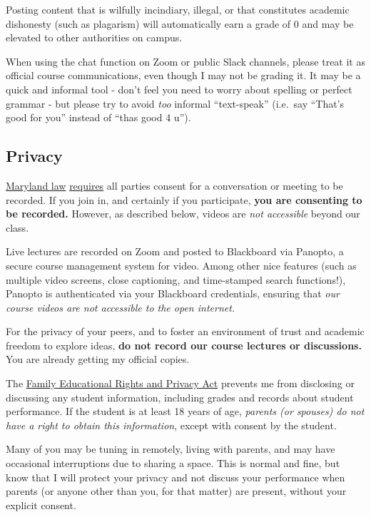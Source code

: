 \documentclass{article}
\begin{document}
Posting content that is wilfully incindiary, illegal, or that
constitutes academic dishonesty (such as plagarism) will automatically
earn a grade of 0 and may be elevated to other authorities on campus.

When using the chat function on Zoom or public Slack channels, please
treat it as official course communications, even though I may not be
grading it. It may be a quick and informal tool - don't feel you need to
worry about spelling or perfect grammar - but please try to avoid
\emph{too} informal ``text-speak'' (i.e.~say ``That's good for you''
instead of ``thas good 4 u'').

\hypertarget{privacy}{%
\subsection*{Privacy}\label{privacy}}

\href{https://www.execvision.io/blog/maryland-call-recording-laws/}{Maryland
law}
\href{https://law.justia.com/codes/maryland/2005/gcj/10-402.html}{requires}
all parties consent for a conversation or meeting to be recorded. If you
join in, and certainly if you participate, \textbf{you are consenting to
be recorded.} However, as described below, videos are \emph{not
accessible} beyond our class.

Live lectures are recorded on Zoom and posted to Blackboard via Panopto,
a secure course management system for video. Among other nice features
(such as multiple video screens, close captioning, and time-stamped
search functions!), Panopto is authenticated via your Blackboard
credentials, ensuring that \emph{our course videos are not accessible to
the open internet.}

For the privacy of your peers, and to foster an environment of trust and
academic freedom to explore ideas, \textbf{do not record our course
lectures or discussions.} You are already getting my official copies.

The
\href{https://www2.ed.gov/policy/gen/guid/fpco/ferpa/index.html}{Family
Educational Rights and Privacy Act} prevents me from disclosing or
discussing any student information, including grades and records about
student performance. If the student is at least 18 years of age,
\emph{parents (or spouses) do not have a right to obtain this
information}, except with consent by the student.

Many of you may be tuning in remotely, living with parents, and may have
occasional interruptions due to sharing a space. This is normal and
fine, but know that I will protect your privacy and not discuss your
performance when parents (or anyone other than you, for that matter) are
present, without your explicit consent.
\end{document}
